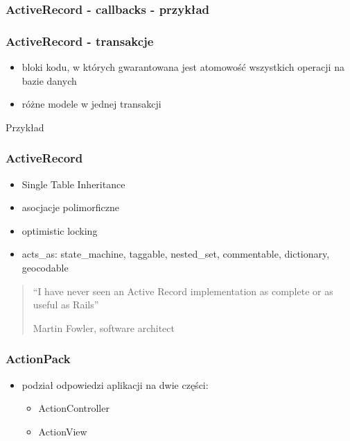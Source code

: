 \documentclass[12t]{beamer}
\begin{document}
\begin{frame}
  \frametitle{ActiveRecord - callbacks - przykład}
  
\end{frame}

\begin{frame}
  \frametitle{ActiveRecord - transakcje}
  \begin{itemize}
  \item bloki kodu, w których gwarantowana jest atomowość wszystkich
    operacji na bazie danych
  \item różne modele w jednej transakcji
  \end{itemize}
  \begin{block}{Przykład}
    
  \end{block}
\end{frame}

\begin{frame}
  \frametitle{ActiveRecord}
  \begin{itemize}
  \item Single Table Inheritance
  \item asocjacje polimorficzne
  \item optimistic locking
  \item acts\_as: state\_machine, taggable, nested\_set, commentable,
    dictionary, geocodable
  \end{itemize}
\end{frame}

\begin{frame}
  \begin{quote}
    “I have never seen an Active Record implementation as complete or as useful as Rails”

    \begin{small}
      \hfill Martin Fowler, software architect
    \end{small}
  \end{quote}
\end{frame}

\begin{frame}
  \frametitle{ActionPack}
  \begin{itemize}
  \item podział odpowiedzi aplikacji na dwie części:
    \begin{itemize}
    \item ActionController
    \item ActionView
    \end{itemize}
  \end{itemize}
\end{frame}
\end{document}
